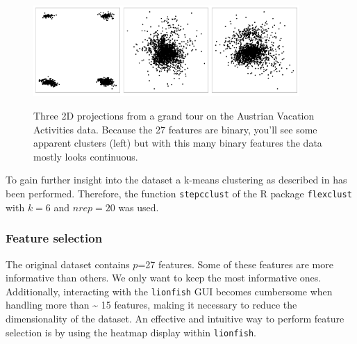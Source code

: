 \documentclass[article]{ajs}
\begin{document}
\begin{figure}[h]
\centerline{\includegraphics[width=0.3\textwidth]{images/winter_proj1.pdf}\includegraphics[width=0.3\textwidth]{images/winter_proj2.pdf}\includegraphics[width=0.3\textwidth]{images/winter_proj3.pdf}}
\caption{Three 2D projections from a grand tour on the Austrian Vacation Activities data. Because the 27 features are binary, you'll see some apparent clusters (left) but with this many binary features the data mostly looks continuous.}
\label{winter-gt}
\end{figure}


To gain further insight into the dataset a k-means clustering as described in \cite{leisch2018market} has been performed. Therefore, the function \texttt{stepcclust} of the R package \texttt{flexclust}\citep{flexclust} with $k=6$ and $nrep=20$ was used.

\subsubsection{Feature selection}

The original dataset contains \(p\)=27 features. Some of these features are more informative than others. We only want to keep the most informative ones. Additionally, interacting with the \texttt{lionfish} GUI becomes cumbersome when handling more than \textasciitilde
 15 features, making it necessary to reduce the dimensionality of the dataset. An effective and intuitive way to perform feature selection is by using the heatmap display within \texttt{lionfish}. 
\end{document}
